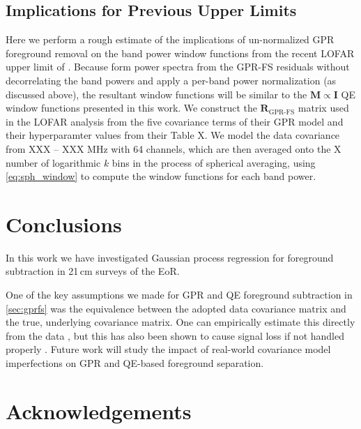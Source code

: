 \documentclass[a4paper,fleqn,usenatbib]{mnras}
\def\R{\boldsymbol{R}}
\def\M{\boldsymbol{M}}
\def\I{\boldsymbol{I}}
\begin{document}
\subsection{Implications for Previous Upper Limits}

Here we perform a rough estimate of the implications of un-normalized GPR foreground removal on the band power window functions from the recent LOFAR upper limit of .
Because  form power spectra from the GPR-FS residuals without decorrelating the band powers and apply a per-band power normalization (as discussed above), the resultant window functions will be similar to the $\M\propto\I$ QE window functions presented in this work.
We construct the $\R_{\operatorname{GPR-FS}}$ matrix used in the LOFAR analysis from the five covariance terms of their GPR model and their hyperparamter values from their Table X.
We model the data covariance from XXX -- XXX MHz with 64 channels, which are then averaged onto the X number of logarithmic $k$ bins in the process of spherical averaging, using \autoref{eq:sph_window} to compute the window functions for each band power.



\section{Conclusions}
\label{sec:conclusions}

In this work we have investigated Gaussian process regression for foreground subtraction in 21\,cm surveys of the EoR.

One of the key assumptions we made for GPR and QE foreground subtraction in \autoref{sec:gprfs} was the equivalence between the adopted data covariance matrix and the true, underlying covariance matrix.
One can empirically estimate this directly from the data \citep[e.g.][]{Dillon2014}, but this has also been shown to cause signal loss if not handled properly \citep{Switzer2016, Cheng2018}.
Future work will study the impact of real-world covariance model imperfections on GPR and QE-based foreground separation.


\section*{Acknowledgements}

\end{document}
